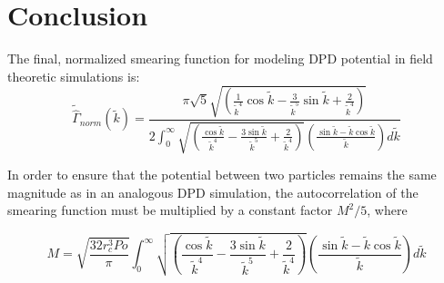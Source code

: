 \documentclass{article}
\begin{document}


\section{Conclusion}
The final, normalized smearing function for modeling DPD potential in field theoretic simulations is:
\begin{equation}
    \boxed{\tilde{\hat{\Gamma}}_{norm}(\tilde {k})= \frac{\pi\sqrt{5}\sqrt{\left( \frac{1}{\tilde{k}^4}\cos{\tilde{k}} - \frac{3}{\tilde{k}^5} \sin{\tilde{k}} + \frac{2}{\tilde{k}^4} \right)}}{2 \int_0^\infty \sqrt{\left( \frac{\cos \tilde k}{\tilde k^4} - \frac{3 \sin \tilde k}{\tilde k^5} + \frac{2}{\tilde k^4} \right)} \left( \frac{\sin \tilde k - \tilde k \cos \tilde k}{\tilde k} \right) d\tilde k}}
    \label{eq:transformed}
 \end{equation}

In order to ensure that the potential between two particles remains the same magnitude as in an analogous DPD simulation, the autocorrelation of the smearing function must be multiplied by a constant factor \(M^2 /5\), where

\[M = \sqrt{\frac{32r_c^3Po}{\pi}} \int_0^\infty \sqrt{\left( \frac{\cos \tilde k}{\tilde k^4} - \frac{3 \sin \tilde k}{\tilde k^5} + \frac{2}{\tilde k^4} \right)} \left( \frac{\sin \tilde k - \tilde k \cos \tilde k}{\tilde k} \right) d\tilde k\]
\end{document}
